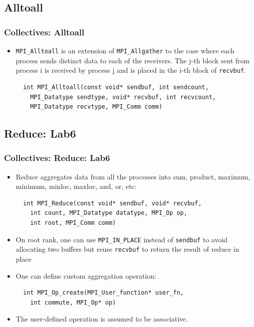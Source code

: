 \documentclass{beamer}
\begin{document}
\subsection{Alltoall}
\begin{frame}[fragile]
  \frametitle{Collectives: Alltoall}
\begin{itemize}
\item {\color{mycolorcode}\verb|MPI_Alltoall|} is an extension of {\color{mycolorcode}\verb|MPI_Allgather|} to the case where each process
sends distinct data to each of the receivers. The j-th block sent from process i is received
by process j and is placed in the i-th block of {\color{mycolorcode}\verb|recvbuf|}.
{\color{mycolorcode}
\begin{verbatim}
  int MPI_Alltoall(const void* sendbuf, int sendcount, 
    MPI_Datatype sendtype, void* recvbuf, int recvcount, 
    MPI_Datatype recvtype, MPI_Comm comm)
\end{verbatim}
}
\end{itemize}
\end{frame}


\subsection{Reduce: Lab6}
\begin{frame}[fragile]
  \frametitle{Collectives: Reduce: Lab6}
\begin{itemize}
\item Reduce aggregates data from all the processes into sum, product, maximum, minimum, minloc, maxloc, and, or, etc:
{\color{mycolorcode}
\begin{verbatim}
  int MPI_Reduce(const void* sendbuf, void* recvbuf, 
    int count, MPI_Datatype datatype, MPI_Op op, 
    int root, MPI_Comm comm)
\end{verbatim}
}
\item On root rank, one can use {\color{mycolorcode}\verb|MPI_IN_PLACE|} instead of {\color{mycolorcode}\verb|sendbuf|} to avoid allocating two buffers but reuse {\color{mycolorcode}\verb|recvbuf|} to return the result of reduce in place
\item One can define custom aggregation operation:
{\color{mycolorcode}
\begin{verbatim}
  int MPI_Op_create(MPI_User_function* user_fn, 
    int commute, MPI_Op* op)
\end{verbatim}
}
\item The user-defined operation is assumed to be associative. 
\end{itemize}
\end{frame}
\end{document}
